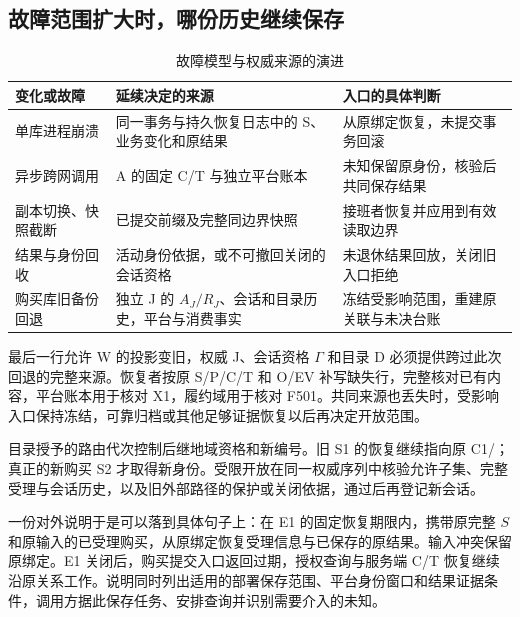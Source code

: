 
\subsection*{故障范围扩大时，哪份历史继续保存}

\begin{table}[htbp]
\centering\small
\caption{故障模型与权威来源的演进}\label{tab:ch15-fault-evolution}
\begin{tabularx}{\linewidth}{@{}p{30mm}X X@{}}
\toprule
变化或故障 & 延续决定的来源 & 入口的具体判断\\
\midrule
单库进程崩溃 & 同一事务与持久恢复日志中的 S、业务变化和原结果 & 从原绑定恢复，未提交事务回滚\\
异步跨网调用 & A 的固定 C/T 与独立平台账本 & 未知保留原身份，核验后共同保存结果\\
副本切换、快照截断 & 已提交前缀及完整同边界快照 & 接班者恢复并应用到有效读取边界\\
结果与身份回收 & 活动身份依据，或不可撤回关闭的会话资格 & 未退休结果回放，关闭旧入口拒绝\\
购买库旧备份回退 & 独立 J 的 $A_J/R_J$、会话和目录历史，平台与消费事实 & 冻结受影响范围，重建原关联与未决台账\\
\bottomrule
\end{tabularx}
\end{table}

最后一行允许 W 的投影变旧，权威 J、会话资格 $\Gamma$ 和目录 D 必须提供跨过此次回退的完整来源。恢复者按原 S/P/C/T 和 O/EV 补写缺失行，完整核对已有内容，平台账本用于核对 X1，履约域用于核对 F501。共同来源也丢失时，受影响入口保持冻结，可靠归档或其他足够证据恢复以后再决定开放范围。

目录授予的路由代次控制后继地域资格和新编号。旧 S1 的恢复继续指向原 C1/；真正的新购买 S2 才取得新身份。受限开放在同一权威序列中核验允许子集、完整受理与会话历史，以及旧外部路径的保护或关闭依据，通过后再登记新会话。

一份对外说明于是可以落到具体句子上：在 E1 的固定恢复期限内，携带原完整 $S$ 和原输入的已受理购买，从原绑定恢复受理信息与已保存的原结果。输入冲突保留原绑定。E1 关闭后，购买提交入口返回过期，授权查询与服务端 C/T 恢复继续沿原关系工作。说明同时列出适用的部署保存范围、平台身份窗口和结果证据条件，调用方据此保存任务、安排查询并识别需要介入的未知。
\FloatBarrier
